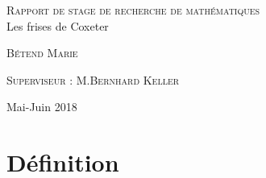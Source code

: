 \documentclass[a4paper]{article}
\theoremstyle{plain}
\theoremstyle{definition}
\theoremstyle{proof}
\theoremstyle{remark}
\begin{document}
\begin{titlepage}
  \begin{sffamily}
	\begin{center}
	
		\textsc{\Large Rapport de stage de recherche de mathématiques}\\
		\vspace{9.5cm}
		{ \huge  Les frises de Coxeter \\[0.4cm] }
		
		\vspace{10cm}
		\begin{minipage}{0.4\textwidth}
			\begin{flushleft} \large
				\textsc{Bétend Marie}\\
			\end{flushleft}
		\end{minipage}
		\begin{minipage}{0.4\textwidth}
			\begin{flushright} \large
				\textsc{Superviseur : M.Bernhard Keller}
			\end{flushright}
		\end{minipage}
		
		\vfill
		
		{\large 	Mai-Juin 2018}
		
	\end{center}
\end{sffamily}
\end{titlepage}
\tableofcontents
\newpage
\part{Définition}
\end{document}
